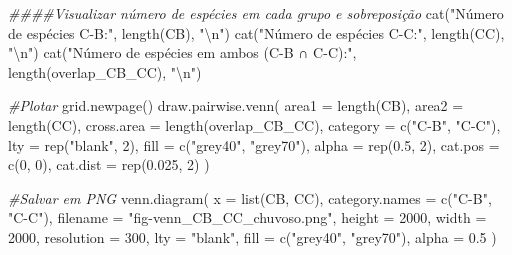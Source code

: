 \documentclass[
  letterpaper,
  DIV=11,
  numbers=noendperiod]{scrartcl}
\newenvironment{Shaded}{}{}
\newcommand{\AttributeTok}[1]{\textcolor[rgb]{0.49,0.56,0.16}{#1}}
\newcommand{\CommentTok}[1]{\textcolor[rgb]{0.38,0.63,0.69}{\textit{#1}}}
\newcommand{\DecValTok}[1]{\textcolor[rgb]{0.25,0.63,0.44}{#1}}
\newcommand{\DocumentationTok}[1]{\textcolor[rgb]{0.73,0.13,0.13}{\textit{#1}}}
\newcommand{\FloatTok}[1]{\textcolor[rgb]{0.25,0.63,0.44}{#1}}
\newcommand{\FunctionTok}[1]{\textcolor[rgb]{0.02,0.16,0.49}{#1}}
\newcommand{\NormalTok}[1]{#1}
\newcommand{\SpecialCharTok}[1]{\textcolor[rgb]{0.25,0.44,0.63}{#1}}
\newcommand{\StringTok}[1]{\textcolor[rgb]{0.25,0.44,0.63}{#1}}
\begin{document}
\begin{Shaded}
\begin{Highlighting}[numbers=left,,]
\DocumentationTok{\#\#\#\#Visualizar número de espécies em cada grupo e sobreposição}
\FunctionTok{cat}\NormalTok{(}\StringTok{"Número de espécies C{-}B:"}\NormalTok{, }\FunctionTok{length}\NormalTok{(CB), }\StringTok{"}\SpecialCharTok{\textbackslash{}n}\StringTok{"}\NormalTok{)}
\FunctionTok{cat}\NormalTok{(}\StringTok{"Número de espécies C{-}C:"}\NormalTok{, }\FunctionTok{length}\NormalTok{(CC), }\StringTok{"}\SpecialCharTok{\textbackslash{}n}\StringTok{"}\NormalTok{)}
\FunctionTok{cat}\NormalTok{(}\StringTok{"Número de espécies em ambos (C{-}B ∩ C{-}C):"}\NormalTok{, }\FunctionTok{length}\NormalTok{(overlap\_CB\_CC), }\StringTok{"}\SpecialCharTok{\textbackslash{}n}\StringTok{"}\NormalTok{)}

\CommentTok{\#Plotar}
\FunctionTok{grid.newpage}\NormalTok{()}
\FunctionTok{draw.pairwise.venn}\NormalTok{(}
  \AttributeTok{area1 =} \FunctionTok{length}\NormalTok{(CB),}
  \AttributeTok{area2 =} \FunctionTok{length}\NormalTok{(CC),}
  \AttributeTok{cross.area =} \FunctionTok{length}\NormalTok{(overlap\_CB\_CC),}
  \AttributeTok{category =} \FunctionTok{c}\NormalTok{(}\StringTok{"C{-}B"}\NormalTok{, }\StringTok{"C{-}C"}\NormalTok{),}
  \AttributeTok{lty =} \FunctionTok{rep}\NormalTok{(}\StringTok{"blank"}\NormalTok{, }\DecValTok{2}\NormalTok{),}
  \AttributeTok{fill =} \FunctionTok{c}\NormalTok{(}\StringTok{"grey40"}\NormalTok{, }\StringTok{"grey70"}\NormalTok{),}
  \AttributeTok{alpha =} \FunctionTok{rep}\NormalTok{(}\FloatTok{0.5}\NormalTok{, }\DecValTok{2}\NormalTok{),}
  \AttributeTok{cat.pos =} \FunctionTok{c}\NormalTok{(}\DecValTok{0}\NormalTok{, }\DecValTok{0}\NormalTok{),}
  \AttributeTok{cat.dist =} \FunctionTok{rep}\NormalTok{(}\FloatTok{0.025}\NormalTok{, }\DecValTok{2}\NormalTok{)}
\NormalTok{)}

\CommentTok{\#Salvar em PNG}
\FunctionTok{venn.diagram}\NormalTok{(}
  \AttributeTok{x =} \FunctionTok{list}\NormalTok{(CB, CC),}
  \AttributeTok{category.names =} \FunctionTok{c}\NormalTok{(}\StringTok{"C{-}B"}\NormalTok{, }\StringTok{"C{-}C"}\NormalTok{),}
  \AttributeTok{filename =} \StringTok{"fig{-}venn\_CB\_CC\_chuvoso.png"}\NormalTok{,}
  \AttributeTok{height =} \DecValTok{2000}\NormalTok{,}
  \AttributeTok{width =} \DecValTok{2000}\NormalTok{,}
  \AttributeTok{resolution =} \DecValTok{300}\NormalTok{,}
  \AttributeTok{lty =} \StringTok{"blank"}\NormalTok{,}
  \AttributeTok{fill =} \FunctionTok{c}\NormalTok{(}\StringTok{"grey40"}\NormalTok{, }\StringTok{"grey70"}\NormalTok{),}
  \AttributeTok{alpha =} \FloatTok{0.5}
\NormalTok{)}
\end{Highlighting}
\end{Shaded}
\end{document}

